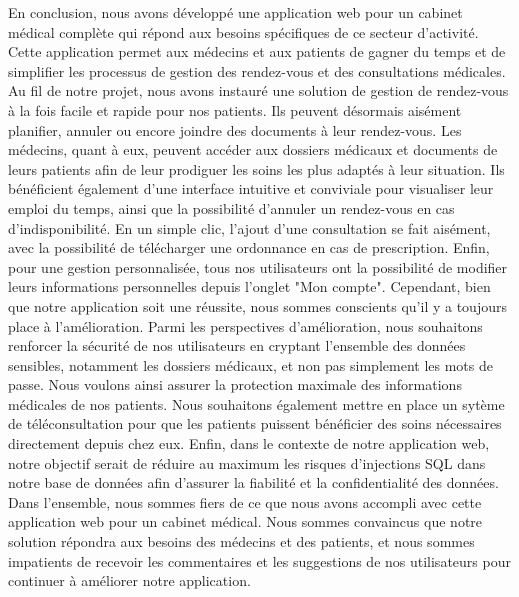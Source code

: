 \documentclass[a4paper]{report}
\begin{document}
En conclusion, nous avons développé une application web pour un cabinet médical complète qui répond aux besoins spécifiques de ce secteur d'activité. Cette application permet aux 
médecins et aux patients de gagner du temps et de simplifier les processus de gestion des rendez-vous et des consultations 
médicales. \newline\newline
Au fil de notre projet, nous avons instauré une solution de gestion de rendez-vous à la fois facile et rapide pour nos patients. 
Ils peuvent désormais aisément planifier, annuler ou encore joindre des documents à leur rendez-vous. Les médecins, quant à eux, 
peuvent accéder aux dossiers médicaux et documents de leurs patients afin de leur prodiguer les soins les plus adaptés à leur situation. 
Ils bénéficient également d'une interface intuitive et conviviale pour visualiser leur emploi du temps, ainsi que la possibilité d'annuler un 
rendez-vous en cas d'indisponibilité. En un simple clic, l'ajout d'une consultation se fait aisément, avec la possibilité de télécharger une ordonnance 
en cas de prescription. Enfin, pour une gestion personnalisée, tous nos utilisateurs ont la possibilité de modifier leurs informations personnelles depuis 
l'onglet "Mon compte".\newline\newline
Cependant, bien que notre application soit une réussite, nous sommes conscients qu'il y a toujours place à l'amélioration. 
Parmi les perspectives d'amélioration, nous souhaitons renforcer la sécurité de nos utilisateurs en cryptant l'ensemble des données 
sensibles, notamment les dossiers médicaux, et non pas simplement les mots de passe. Nous voulons ainsi assurer la protection maximale 
des informations médicales de nos patients. 
Nous souhaitons également mettre en place un sytème de téléconsultation pour que les patients puissent bénéficier 
des soins nécessaires directement depuis chez eux. Enfin, dans le contexte de notre application web,  notre objectif serait de réduire au maximum 
les risques d'injections SQL dans notre base de données afin d'assurer la fiabilité et la confidentialité des données. \newline\newline
Dans l'ensemble, nous sommes fiers de ce que nous avons accompli avec cette application web pour un cabinet médical. Nous sommes 
convaincus que notre solution répondra aux besoins des médecins et des patients, et nous sommes impatients de recevoir les commentaires 
et les suggestions de nos utilisateurs pour continuer à améliorer notre application.



\end{document}
